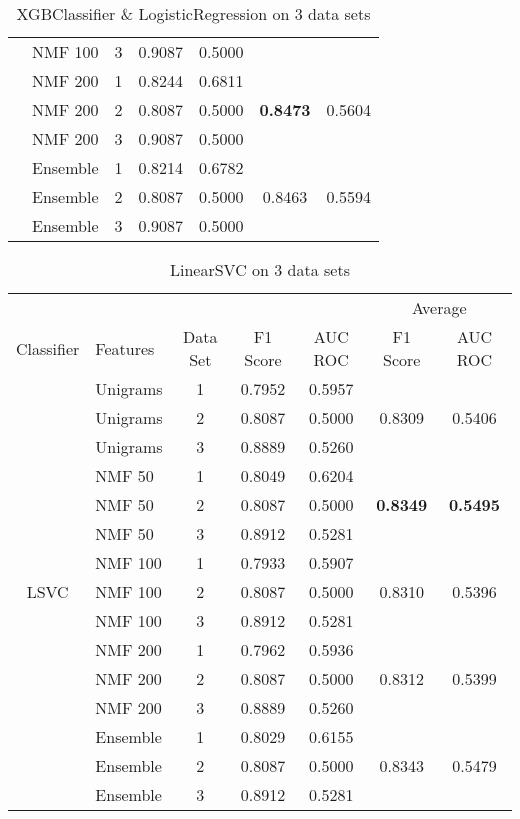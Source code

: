 \documentclass[12pt, twoside]{article}
\begin{document}
\begin{table}[!htbp]
\begin{tabular}{clccccc}
  	&	NMF 100	&	3	&	0.9087	&	0.5000	&		&	 \\
  	\cmidrule(r){2-7}
  	&	NMF 200	&	1	&	0.8244	&	0.6811	&		&	 \\
  	&	NMF 200	&	2	&	0.8087	&	0.5000	&	\textbf{0.8473}	&	0.5604 \\
  	&	NMF 200	&	3	&	0.9087	&	0.5000	&		&	 \\
  	\cmidrule(r){2-7}
  	&	Ensemble	&	1	&	0.8214	&	0.6782	&		&	 \\
  	&	Ensemble	&	2	&	0.8087	&	0.5000	&	0.8463	&	0.5594 \\
  	&	Ensemble	&	3	&	0.9087	&	0.5000	&		&	 \\
  \bottomrule
  \end{tabular}
  \caption{XGBClassifier \& LogisticRegression on 3 data sets}
\end{table}

\begin{table}[!htbp]
  \centering
  \begin{tabular}{clccccc}
  \toprule
  {} & {} &	{}	& {}	&	{} & \multicolumn{2}{c}{Average} \\
  \cmidrule(r){6-7}
  Classifier	&	Features	&	Data Set	&	F1 Score	&	AUC ROC	&	F1 Score	&	AUC ROC \\
  \midrule
  	&	Unigrams	&	1	&	0.7952	&	0.5957	&		&	 \\
  	&	Unigrams	&	2	&	0.8087	&	0.5000	&	0.8309	&	0.5406 \\
  	&	Unigrams	&	3	&	0.8889	&	0.5260	&		&	 \\
  	\cmidrule(r){2-7}
  	&	NMF 50	&	1	&	0.8049	&	0.6204	&		&	 \\
  	&	NMF 50	&	2	&	0.8087	&	0.5000	&	\textbf{0.8349}	&	\textbf{0.5495} \\
  	&	NMF 50	&	3	&	0.8912	&	0.5281	&		&	 \\
  	\cmidrule(r){2-7}
  	&	NMF 100	&	1	&	0.7933	&	0.5907	&		&	 \\
  LSVC	&	NMF 100	&	2	&	0.8087	&	0.5000	&	0.8310	&	0.5396 \\
  	&	NMF 100	&	3	&	0.8912	&	0.5281	&		&	 \\
  	\cmidrule(r){2-7}
  	&	NMF 200	&	1	&	0.7962	&	0.5936	&		&	 \\
  	&	NMF 200	&	2	&	0.8087	&	0.5000	&	0.8312	&	0.5399 \\
  	&	NMF 200	&	3	&	0.8889	&	0.5260	&		&	 \\
  	\cmidrule(r){2-7}
  	&	Ensemble	&	1	&	0.8029	&	0.6155	&		&	 \\
  	&	Ensemble	&	2	&	0.8087	&	0.5000	&	0.8343	&	0.5479 \\
  	&	Ensemble	&	3	&	0.8912	&	0.5281	&		&	 \\
  \bottomrule
  \end{tabular}
  \caption{LinearSVC on 3 data sets}
\end{table}
\end{document}
